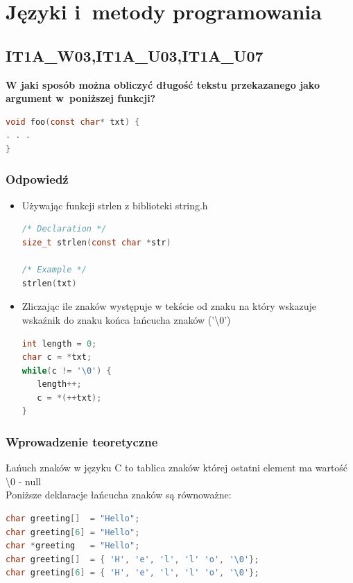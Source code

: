 \chapter{Języki i~metody programowania}
\PartialToc


\section{IT1A\_W03,IT1A\_U03,IT1A\_U07}
\textbf{W jaki sposób można obliczyć długość tekstu przekazanego jako argument w~poniższej funkcji?}
\begin{lstlisting}[language=c]
void foo(const char* txt) {
. . .
}
\end{lstlisting}
\subsection{Odpowiedź}

\begin{itemize}
\item Używając funkcji strlen z biblioteki string.h
\begin{lstlisting}[language=c]
/* Declaration */
size_t strlen(const char *str)

/* Example */
strlen(txt)
\end{lstlisting}

\item Zliczając ile znaków występuje w tekście od znaku na który wskazuje wskaźnik do znaku końca łańcucha znaków ('\textbackslash0')
\begin{lstlisting}[language=c]
int length = 0;
char c = *txt;
while(c != '\0') {
   length++;
   c = *(++txt);
}
\end{lstlisting}
\end{itemize}
  
\subsection{Wprowadzenie teoretyczne}
Łańuch znaków w języku C to tablica znaków której ostatni element ma wartość \textbackslash0 - null\\
Poniższe deklaracje łańcucha znaków są równoważne:
\begin{lstlisting}[language=c]
char greeting[]  = "Hello";
char greeting[6] = "Hello";
char *greeting   = "Hello";
char greeting[]  = { 'H', 'e', 'l', 'l' 'o', '\0'};
char greeting[6] = { 'H', 'e', 'l', 'l' 'o', '\0'};
\end{lstlisting}

